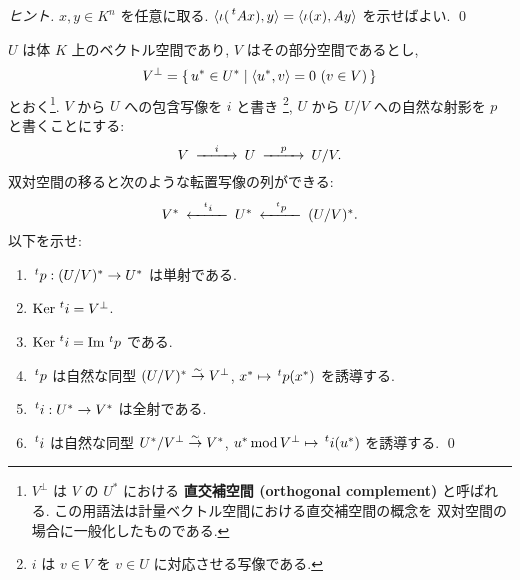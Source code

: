 \documentclass[12pt,twoside]{jarticle}
\begin{document}
\begin{proof}[ヒント]
  $x,y\in K^n$ を任意に取る.
  $\bra \iota(\tp{A}x), y\ket = \bra \iota(x),Ay\ket$ を示せばよい.
  \qed
\end{proof}


\begin{question}[商空間と部分空間の双対, 20点]
  $U$ は体 $K$ 上のベクトル空間であり, $V$ はその部分空間であるとし,
  \begin{equation*}
    V^\bot = \{\, u^*\in U^* \mid \langle u^*,v\rangle = 0 \ (v\in V) \,\}
  \end{equation*}
  とおく\footnote{$V^\bot$ は $V$ の $U^*$ における
    {\bf 直交補空間 (orthogonal complement)} と呼ばれる.
    この用語法は計量ベクトル空間における直交補空間の概念を
    双対空間の場合に一般化したものである.}.
  $V$ から $U$ への包含写像を $i$ と書き%
  \footnote{$i$ は $v\in V$ を $v\in U$ に対応させる写像である.}, 
  $U$ から $U/V$ への自然な射影を $p$ と書くことにする:
  \begin{equation*}
    \begin{CD}
      V @>i>> U @>p>> U/V. \\
    \end{CD}
  \end{equation*}
  双対空間の移ると次のような転置写像の列ができる:
  \begin{equation*}
    \begin{CD}
      V^* @<\tp{i}<< U^* @<\tp{p}<< (U/V)^*.
    \end{CD}
  \end{equation*}
  以下を示せ:
  \begin{enumerate}
  \item $\tp{p}:(U/V)^*\to U^*$ は単射である.
  \item $\Ker\tp{i}=V^\bot$.
  \item $\Ker\tp{i}=\Image\tp{p}$ である.
  \item $\tp{p}$ は自然な同型 $(U/V)^*\overset\sim\rightarrow V^\bot$,
    $x^*\mapsto \tp{p}(x^*)$ を誘導する.
  \item $\tp{i}:U^*\to V^*$ は全射である.
  \item $\tp{i}$ は自然な同型 $U^*/V^\bot \overset\sim\rightarrow V^*$,
    $u^*\MOD V^\bot \mapsto \tp{i}(u^*)$ を誘導する.
    \qed
  \end{enumerate}
\end{question}
\end{document}
